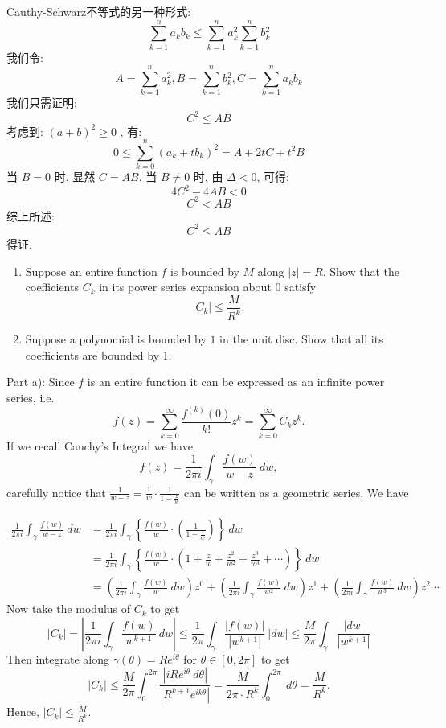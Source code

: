 \documentclass[12pt]{article}
\newenvironment{solution}[2][Solution]{\begin{trivlist}
\item[\hskip \labelsep {\bfseries #1}]}{\end{trivlist}}
\newenvironment{problem}[2][Problem]{\begin{trivlist}
\item[\hskip \labelsep {\bfseries #1}\hskip \labelsep {\bfseries #2.}]}{\end{trivlist}}
\begin{document}
\begin{solution}{2}
Cauthy-Schwarz不等式的另一种形式:
\[
\sum_{k=1}^{n} a_kb_k \leq \sum_{k=1}^n a{_k^2} \sum_{k=1}^{n} b{_k^2}
\]
我们令:
\[
A = \sum_{k=1}^{n} a{_k^2}, 
B = \sum_{k=1}^{n} b{_k^2},
C = \sum_{k=1}^{n} a_kb_k
\]
我们只需证明:
\[
C^2 \leq AB
\]
考虑到: $(a+b)^2 \geq 0$ , 有:
\[
0 \leq \sum_{k=0}^n (a_k+tb_k)^2 = A + 2tC + t^2B
\]
当 $B = 0$ 时, 显然 $C = AB$.
当 $B \neq 0$ 时, 由 $\Delta <0$, 可得:
\[
4C^2 - 4AB < 0
\]
\[
C^2 < AB
\]
综上所述:
\[
C^2 \leq AB
\]
得证.
\end{solution}


\vspace{2cm}



\begin{problem}{6}
\begin{enumerate}[label=\alph*)]
    \item Suppose an entire function $f$ is bounded by $M$ along $|z|=R$. Show that the coefficients $C_k$ in its power series expansion about $0$ satisfy
    \[
    |C_k|\leq\frac{M}{R^k}.
    \]
    \item Suppose a polynomial is bounded by $1$ in the unit disc. Show that all its coefficients are bounded by 1.
\end{enumerate}
\end{problem}

\begin{solution}{}
Part a): Since $f$ is an entire function it can be expressed as an infinite power series, i.e.
\[
f(z)=\sum_{k=0}^\infty\frac{f^{(k)}(0)}{k!}z^k=\sum_{k=0}^\infty C_kz^k.
\]
If we recall Cauchy's Integral we have
\[
f(z)=\frac{1}{2\pi i}\int_\gamma\frac{f(w)}{w-z}\ dw,
\]
carefully notice that $\frac{1}{w-z}=\frac{1}{w}\cdot\frac{1}{1-\frac{z}{w}}$ can be written as a geometric series. We have

\begin{align*}
\frac{1}{2\pi i}\int_\gamma\frac{f(w)}{w-z}\ dw &=\frac{1}{2\pi i}\int_\gamma\left\lbrace\frac{f(w)}{w}\cdot\left(\frac{1}{1-\frac{z}{w}}\right) \right\rbrace\ dw\\[8pt]
&=\frac{1}{2\pi i}\int_\gamma\left\lbrace\frac{f(w)}{w}\cdot\left(1+\frac{z}{w}+\frac{z^2}{w^2}+\frac{z^3}{w^3}+\cdots\right) \right\rbrace\ dw\\[8pt]
&=\left(\frac{1}{2\pi i}\int_\gamma \frac{f(w)}{w}\ dw\right)z^0+\left(\frac{1}{2\pi i}\int_\gamma \frac{f(w)}{w^2}\ dw\right)z^1+\left(\frac{1}{2\pi i}\int_\gamma \frac{f(w)}{w^3}\ dw\right)z^2\cdots
\end{align*}
Now take the modulus of $C_k$ to get
\[
|C_k|=\left\lvert\frac{1}{2\pi i}\int_\gamma \frac{f(w)}{w^{k+1}}\ dw \right\rvert\leq\frac{1}{2\pi}\int_\gamma\frac{|f(w)|}{|w^{k+1}|}\ |dw|\leq \frac{M}{2\pi}\int_\gamma\frac{|dw|}{|w^{k+1}|}
\]
Then integrate along $\gamma(\theta)=Re^{i\theta}$ for $\theta\in [0,2\pi]$ to get
\[
|C_k|\leq \frac{M}{2\pi}\int_0^{2\pi}\frac{|iRe^{i\theta}\ d\theta|}{|R^{k+1}e^{ik\theta}|}=\frac{M}{2\pi\cdot R^k}\int_0^{2\pi}\ d\theta=\frac{M}{R^k}.
\]
Hence, $|C_k|\leq \frac{M}{R^k}$.
\end{solution}
\pagebreak
\end{document}
